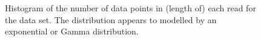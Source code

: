 \begin{figure}
	\centering

	\caption[Histogram of the number of data points in (length of) each read for the data set.]{\label{fig:n-hist}Histogram of the number of data points in (length of) each read for the data set. The distribution appears to modelled by an exponential or Gamma distribution.}
\end{figure}
